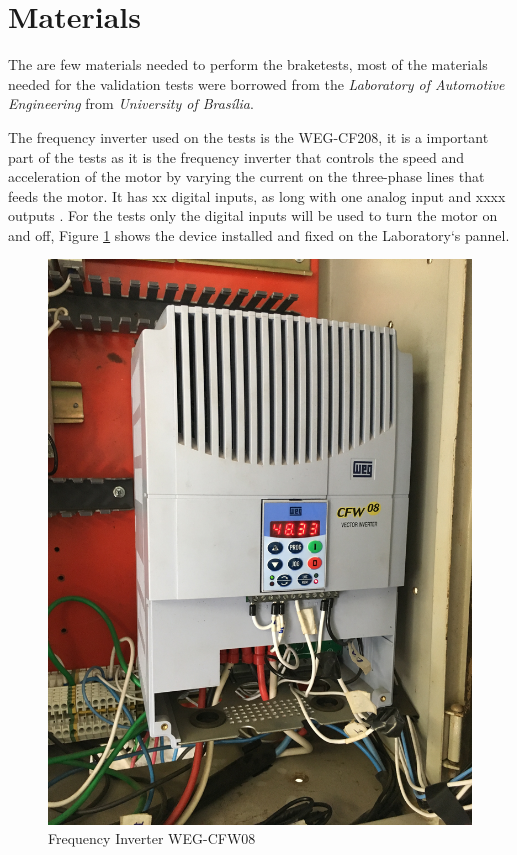 \section{Materials}\label{sec:materials}
		The are few materials needed to perform the braketests, most of the materials needed for the validation tests were borrowed from the \textit{Laboratory of Automotive Engineering} from \textit{University of Brasília}.
		\par
		The frequency inverter used on the tests is the WEG-CF208, it is a important part of the tests as it is the frequency inverter that controls the speed and acceleration of the motor by varying the current on the three-phase lines that feeds the motor. It has xx digital inputs, as long with one analog input and xxxx outputs \cite{weg-CFW08}. For the tests only the digital inputs will be used to turn the motor on and off, Figure \ref{fig:frequency-inverter} shows the device installed and fixed on the Laboratory`s pannel.

		\begin{figure}[htbp]
			\centering
			\includegraphics[scale=0.7]{figuras/fig-frequency-inverter}
			\caption{Frequency Inverter WEG-CFW08}
			\label{fig:frequency-inverter}
		\end{figure}
		\par

